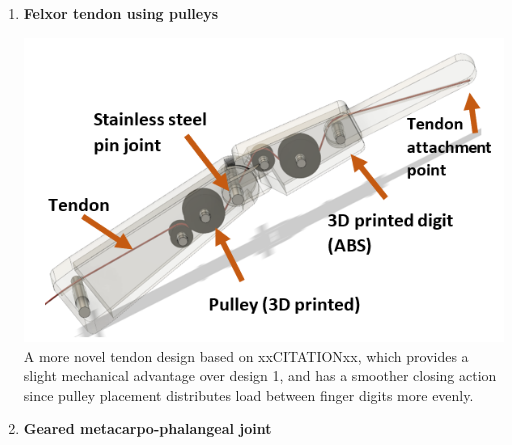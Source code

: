 \documentclass[12pt,3p]{report}
\begin{document}
\begin{multicols}{2}
\begin{enumerate}
{			}
			\item \textbf{Felxor tendon using pulleys} {
							
				\includegraphics[scale=0.5]{pulley.PNG}
				A more novel tendon design based on xxCITATIONxx, which provides a slight mechanical advantage over design 1, and has a smoother closing action since pulley placement distributes load between finger digits more evenly. 
			}
			\item \textbf{Geared metacarpo-phalangeal joint} {
			
}
\end{enumerate}
\end{multicols}
\end{document}
